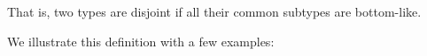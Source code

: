 \noindent That is, two types are disjoint if all their common subtypes are bottom-like.
\begin{comment}
With this definition we have that different primitive types are disjoint. For example
$[[Int]] * [[Bool]]$ since the only common subtypes of $[[Int]]$ and $[[Bool]]$
are bottom-like. A more interesting case is the disjointness of two function types.
It turns out that function types are never disjoint, since we can always find
a common subtype for any two function types. For example, if we have $[[Int -> Bool]]$
and $[[String -> Char]]$ then a common subtype that is not bottom-like is
$[[Top -> Bot]]$. Therefore, $[[Int -> Bool]]$ and $[[String -> Char]]$ are not
disjoint.

\noindent Reader may think at this point that $[[Bot]]$ type can simply be used in \Cref{def:union:disj}
instead of $[[botlike C]]$ in the conclusion. Answer to this question is
union type with $[[Bot]]$ as all primitive types is also a least subtype in \cal.
$[[botlike C]]$ also handles this case.
\end{comment}
We illustrate this definition with a few examples:


